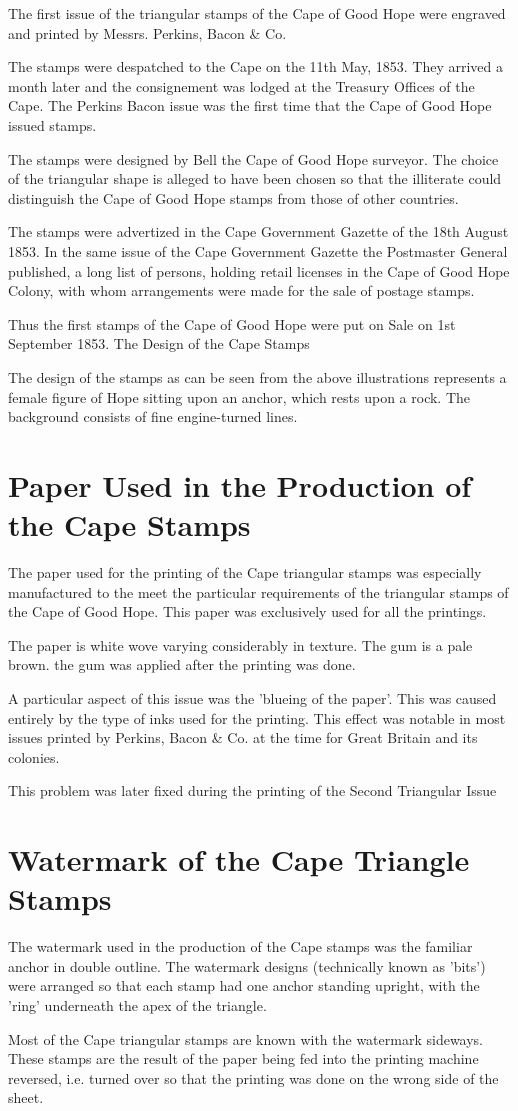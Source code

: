 The first issue of the triangular stamps of the Cape of Good Hope were engraved and printed by Messrs. Perkins, Bacon & Co.

The stamps were despatched to the Cape on the 11th May, 1853. They arrived a month later and the consignement was lodged at the Treasury Offices of the Cape. The Perkins Bacon issue was the first time that the Cape of Good Hope issued stamps.

The stamps were designed by Bell the Cape of Good Hope surveyor. The choice of the triangular shape is alleged to have been chosen so that the illiterate could distinguish the Cape of Good Hope stamps from those of other countries.

The stamps were advertized in the Cape Government Gazette of the 18th August 1853. In the same issue of the Cape Government Gazette 
the Postmaster General published, a long list of persons, holding retail licenses in the Cape of Good Hope Colony, with whom arrangements were made for the sale of postage stamps.

Thus the first stamps of the Cape of Good Hope were put on Sale on 1st September 1853.
The Design of the Cape Stamps

The design of the stamps as can be seen from the above illustrations represents a female figure of Hope sitting upon an anchor, which rests upon a rock. The background consists of fine engine-turned lines.

\section{Paper Used in the Production of the Cape Stamps
} 
The paper used for the printing of the Cape triangular stamps was especially manufactured to the meet the particular requirements of the triangular stamps of the Cape of Good Hope. This paper was exclusively used for all the printings.

The paper is white wove varying considerably in texture. The gum is a pale brown. the gum was applied after the printing was done.

A particular aspect of this issue was the 'blueing of the paper'. This was caused entirely by the type of inks used for the printing. This effect was notable in most issues printed by Perkins, Bacon & Co. at the time for Great Britain and its colonies.

This problem was later fixed during the printing of the Second Triangular Issue

\section{Watermark of the Cape Triangle Stamps
} 
The watermark used in the production of the Cape stamps was the familiar anchor in double outline. The watermark designs (technically known as 'bits') were arranged so that each stamp had one anchor standing upright, with the 'ring' underneath the apex of the triangle.

Most of the Cape triangular stamps are known with the watermark sideways. These stamps are the result of the paper being fed into the printing machine reversed, i.e. turned over so that the printing was done on the wrong side of the sheet.

 

       